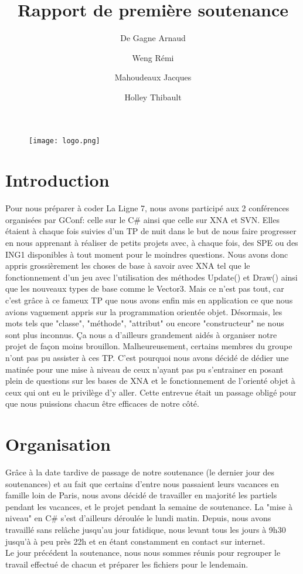 \documentclass[12pt,a4paper]{article}  %
\title {Rapport de première soutenance}
\author {De Gagne Arnaud\and Weng Rémi\and Mahoudeaux Jacques\and Holley Thibault}
\date {}
\begin{document}
\maketitle
\begin{figure}[hp]
	\centering
	\texttt{[image: logo.png]}
	\label{fig:aMAZEing escape}
\end{figure}


\pagestyle{fancy}
\renewcommand{\headrulewidth}{0.4pt}
\renewcommand{\footrulewidth}{0.4pt}

\newpage
\tableofcontents 
\newpage

\section {Introduction}
Pour nous préparer à coder La Ligne 7, nous avons participé aux 2 conférences organisées par GConf: celle sur le C\# ainsi que celle sur XNA et SVN. Elles étaient à chaque fois suivies d'un TP de nuit dans le but de nous faire progresser en nous apprenant à réaliser de petits projets avec, à chaque fois, des SPE ou des ING1 disponibles à tout moment pour le moindres questions. Nous avons donc appris grossièrement les choses de base à savoir avec XNA tel que le fonctionnement d'un jeu avec l'utilisation des méthodes Update() et Draw() ainsi que les nouveaux types de base comme le Vector3. Mais ce n'est pas tout, car c'est grâce à ce fameux TP que nous avons enfin mis en application ce que nous avions vaguement appris sur la programmation orientée objet. Désormais, les mots tels que "classe", "méthode", "attribut" ou encore "constructeur" ne nous sont plus inconnus. Ça nous a d'ailleurs grandement aidés à organiser notre projet de façon moins brouillon. Malheureusement, certains membres du groupe n'ont pas pu assister à ces TP. C'est pourquoi nous avons décidé de dédier une matinée pour une mise à niveau de ceux n'ayant pas pu s'entrainer en posant plein de questions sur les bases de XNA et le fonctionnement de l'orienté objet à ceux qui ont eu le privilège d'y aller. Cette entrevue était un passage obligé pour que nous puissions chacun être efficaces de notre côté.

\section {Organisation}

Grâce à la date tardive de passage de notre soutenance (le dernier jour des soutenances) et au fait que certains d'entre nous passaient leurs vacances en famille loin de Paris, nous avons décidé de travailler en majorité les partiels pendant les vacances, et le projet pendant la semaine de soutenance. La "mise à niveau" en C\# s'est d'ailleurs déroulée le lundi matin. Depuis, nous avons travaillé sans relâche jusqu'au jour fatidique, nous levant tous les jours à 9h30 jusqu'à à peu près 22h et en étant constamment en contact sur internet.\\
Le jour précédent la soutenance, nous nous sommes réunis pour regrouper le travail effectué de chacun et préparer les fichiers pour le lendemain.
\end{document}
